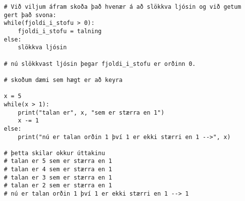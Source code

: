 \begin{lstlisting}[caption=Ap nota else með while, label=lst:lykkjur-while-else]
# Við viljum áfram skoða það hvenær á að slökkva ljósin og við getum gert það svona:
while(fjoldi_i_stofu > 0):
	fjoldi_i_stofu = talning
else:
	slökkva ljósin
	
# nú slökkvast ljósin þegar fjoldi_i_stofu er orðinn 0.

# skoðum dæmi sem hægt er að keyra

x = 5
while(x > 1):
	print("talan er", x, "sem er stærra en 1")
	x -= 1 
else:
	print("nú er talan orðin 1 því 1 er ekki stærri en 1 -->", x)
	
# þetta skilar okkur úttakinu
# talan er 5 sem er stærra en 1
# talan er 4 sem er stærra en 1
# talan er 3 sem er stærra en 1
# talan er 2 sem er stærra en 1
# nú er talan orðin 1 því 1 er ekki stærri en 1 --> 1
\end{lstlisting}
